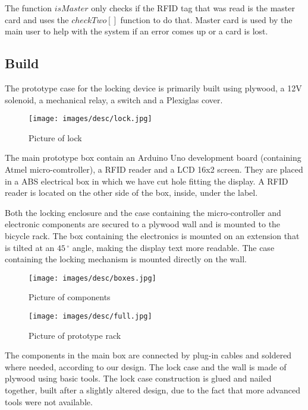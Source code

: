 \clearpage




The function $isMaster$ only checks if the RFID tag that was read is the master card and uses the $checkTwo[]$ function to do that. Master card is used by the main user to help with the system if an error comes up or a card is lost.



\subsection{Build}

The prototype case for the locking device is primarily built using plywood, a 12V solenoid, a mechanical relay, a switch and a Plexiglas cover.
 
\begin{figure}[H]
	\centering
	\texttt{[image: images/desc/lock.jpg]}
	\caption{Picture of lock}
	\label{fig.lock}
\end{figure}


The main prototype box contain an Arduino Uno development board (containing Atmel micro-comtroller), a RFID reader and a LCD 16x2 screen. They are placed in a ABS electrical box in which we have cut hole fitting the display. A RFID reader is located on the other side of the box, inside, under the label.

Both the locking enclosure and the case containing the micro-controller and electronic components are secured to a plywood wall and is mounted to the bicycle rack. The box containing the electronics is mounted on an extension that is tilted at an $45\,^{\circ}$ angle, making the display text more readable. The case containing the locking mechanism is mounted directly on the wall.

\begin{figure}[H]
	\centering
	\texttt{[image: images/desc/boxes.jpg]}
	\caption{Picture of components}
	\label{fig.rack}
\end{figure}


\begin{figure}[H]
	\centering
	\texttt{[image: images/desc/full.jpg]}
	\caption{Picture of prototype rack}
	\label{fig.rack}
\end{figure}

The components in the main box are connected by plug-in cables and soldered where needed, according to our design. The lock case and the wall is made of plywood using basic tools. The lock case construction is glued and nailed together, built after a slightly altered design, due to the fact that more advanced tools were not available. 
